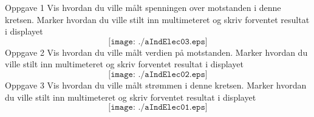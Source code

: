 \documentclass[12pt,a4paper]{article}
\begin{document}
\Huge
Oppgave 1
\normalsize
\vskip 0.5cm
Vis hvordan du ville målt spenningen over motstanden i denne kretsen. Marker hvordan du ville stilt inn multimeteret og skriv forventet resultat i displayet 
$$\texttt{[image: ./aIndElec03.eps]}$$
\newpage
\Huge
Oppgave 2
\normalsize
\vskip 0.5cm
Vis hvordan du ville målt verdien på motstanden. Marker hvordan du ville stilt inn multimeteret og skriv forventet resultat i displayet 
$$\texttt{[image: ./aIndElec02.eps]}$$
\newpage
\Huge
Oppgave 3
\normalsize
\vskip 0.5cm
Vis hvordan du ville målt strømmen i denne kretsen. Marker hvordan du ville stilt inn multimeteret og skriv forventet resultat i displayet 
$$\texttt{[image: ./aIndElec01.eps]}$$
\vskip 1cm
\vskip 1cm
\end{document}
